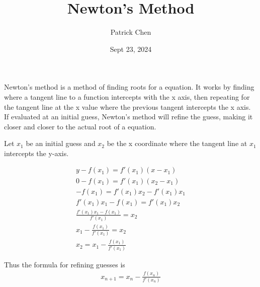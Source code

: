 \documentclass{article}
\title{Newton's Method}
\author{Patrick Chen}
\date{Sept 23, 2024}
\theoremstyle{mytheoremstyle}
\theoremstyle{mytheoremstyle}
\theoremstyle{myproblemstyle}
\begin{document}
    \maketitle
    Newton's method is a method of finding roots for a equation. It works by
    finding where a tangent line to a function intercepts with the x axis, then
    repeating for the tangent line at the x value where the previous tangent
    intercepts the x axis. If evaluated at an initial guess, Newton's method
    will refine the guess, making it closer and closer to the actual root of a
    equation.

    Let $x_1$ be an initial guess and $x_2$ be the x coordinate where the
    tangent line at $x_1$ intercepts the y-axis.

    \begin{align*}
        y-f(x_1) = f'(x_1)(x-x_1) \\
        0-f(x_1) = f'(x_1)(x_2-x_1) \\
        -f(x_1) = f'(x_1)x_2-f'(x_1)x_1 \\
        f'(x_1)x_1 - f(x_1) = f'(x_1)x_2 \\
        \frac{f'(x_1)x_1 - f(x_1)}{f'(x_1)} = x_2 \\
        x_1 - \frac{f(x_1)}{f'(x_1)} = x_2 \\
        x_2=x_1 - \frac{f(x_1)}{f'(x_1)}
    \end{align*}

    Thus the formula for refining guesses is
    \begin{align*}
        x_{n+1} = x_n - \frac{f(x_n)}{f'(x_n)}
    \end{align*}
\end{document}
